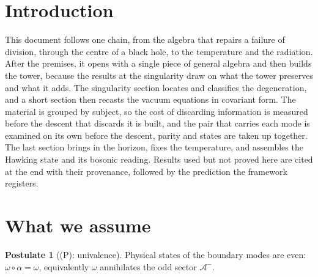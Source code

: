 \documentclass[11pt]{article}
\theoremstyle{definition}
\newtheorem{postulate}[theorem]{Postulate}
\theoremstyle{plain}
\providecommand{\Aod}{}\renewcommand{\Aod}{\mathcal{A}^{-}}
\begin{document}
\section*{Introduction}
This document follows one chain, from the algebra that repairs a failure of division, through the centre of a black hole, to the temperature and the radiation. After the premises, it opens with a single piece of general algebra and then builds the tower, because the results at the singularity draw on what the tower preserves and what it adds. The singularity section locates and classifies the degeneration, and a short section then recasts the vacuum equations in covariant form. The material is grouped by subject, so the cost of discarding information is measured before the descent that discards it is built, and the pair that carries each mode is examined on its own before the descent, parity and states are taken up together. The last section brings in the horizon, fixes the temperature, and assembles the Hawking state and its bosonic reading. Results used but not proved here are cited at the end with their provenance, followed by the prediction the framework registers.

\section{What we assume}

\begin{postulate}[(P): univalence]\label{c:singularity.p-univalence}
Physical states of the boundary modes are even: $\omega \circ \alpha = \omega$, equivalently $\omega$ annihilates the odd sector $\Aod$.
\end{postulate}
\end{document}
